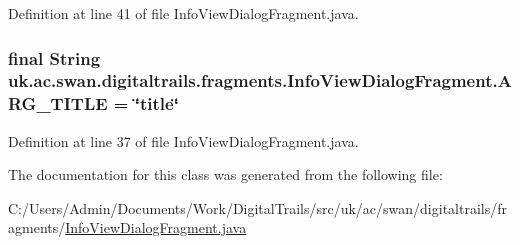 Definition at line 41 of file Info\+View\+Dialog\+Fragment.\+java.

\hypertarget{classuk_1_1ac_1_1swan_1_1digitaltrails_1_1fragments_1_1_info_view_dialog_fragment_abc5f258510b73a9b73edf43223860fd7}{
\subsubsection[{A\+R\+G\+\_\+\+T\+I\+T\+L\+E}]{\setlength{\rightskip}{0pt plus 5cm}final String uk.\+ac.\+swan.\+digitaltrails.\+fragments.\+Info\+View\+Dialog\+Fragment.\+A\+R\+G\+\_\+\+T\+I\+T\+L\+E = \char`\"{}title\char`\"{}\hspace{0.3cm}{\ttfamily [static]}}}\label{classuk_1_1ac_1_1swan_1_1digitaltrails_1_1fragments_1_1_info_view_dialog_fragment_abc5f258510b73a9b73edf43223860fd7}


Definition at line 37 of file Info\+View\+Dialog\+Fragment.\+java.



The documentation for this class was generated from the following file\+:\begin{DoxyCompactItemize}
\item 
C\+:/\+Users/\+Admin/\+Documents/\+Work/\+Digital\+Trails/src/uk/ac/swan/digitaltrails/fragments/\hyperlink{_info_view_dialog_fragment_8java}{Info\+View\+Dialog\+Fragment.\+java}\end{DoxyCompactItemize}
